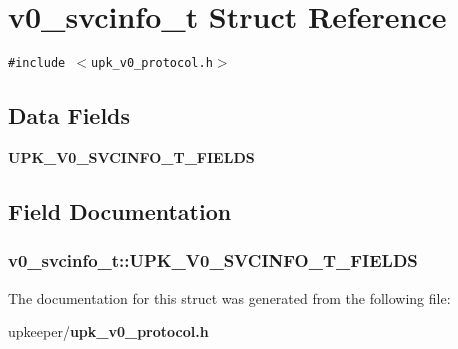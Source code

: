 \section{v0\_\-svcinfo\_\-t Struct Reference}
\label{structv0__svcinfo__t}
{\tt \#include $<$upk\_\-v0\_\-protocol.h$>$}

\subsection*{Data Fields}
\begin{CompactItemize}
\item 
\bf{UPK\_\-V0\_\-SVCINFO\_\-T\_\-FIELDS}
\end{CompactItemize}


\subsection{Field Documentation}
\subsubsection{\setlength{\rightskip}{0pt plus 5cm}\bf{v0\_\-svcinfo\_\-t::UPK\_\-V0\_\-SVCINFO\_\-T\_\-FIELDS}}\label{structv0__svcinfo__t_5e5c7bfa9dacf1ca2efa2b7cac5bee46}




The documentation for this struct was generated from the following file:\begin{CompactItemize}
\item 
upkeeper/\bf{upk\_\-v0\_\-protocol.h}\end{CompactItemize}
